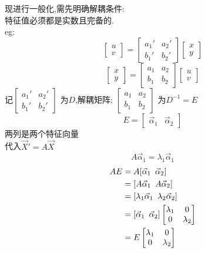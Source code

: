 现进行一般化,需先明确解耦条件:\\
特征值必须都是实数且完备的.\\
eg:
\[
\begin{bmatrix}
    u \\
    v
\end{bmatrix} =
\begin{bmatrix}
    a_1' & a_2' \\
    b_1' & b_2'
\end{bmatrix}
\begin{bmatrix}
    x \\
    y
\end{bmatrix}
\]
\[
\begin{bmatrix}
    x \\
    y
\end{bmatrix}=
\begin{bmatrix}
    a_1 & a_2 \\
    b_1 & b_2
\end{bmatrix}
\begin{bmatrix}
    u \\
    v
\end{bmatrix}
\]
记$
\begin{bmatrix}
    a_1' & a_2' \\
    b_1' & b_2'
\end{bmatrix}$ 为$D$,解耦矩阵; 
$\begin{bmatrix}
    a_1 & a_2 \\
    b_1 & b_2
\end{bmatrix}$ 为$D^{-1}=E$\\
\[ E =
\begin{bmatrix}
    \vec{\alpha}_1 & \vec{\alpha}_2
\end{bmatrix}
\]
两列是两个特征向量\\
代入$\vec{X}' = A \vec{X}$
\[ A \vec{\alpha}_1 = \lambda_1 \vec{\alpha}_1 \]
\begin{align*}
    A E &= A [\vec{\alpha}_1 \hspace*{0.5em} \vec{\alpha}_2] \\
    &= [A \vec{\alpha}_1 \hspace*{0.5em} A \vec{\alpha}_2] \\
    &= [\lambda_1 \vec{\alpha}_1 \hspace*{0.5em} \lambda_2\vec{\alpha}_2] \\
    &= [\vec{\alpha}_1 \hspace*{0.5em} \vec{\alpha}_2] 
    \begin{bmatrix}
        \lambda_1 & 0 \\
        0 & \lambda_2
    \end{bmatrix} \\
    &= E
    \begin{bmatrix}
        \lambda_1 & 0 \\
        0 & \lambda_2
    \end{bmatrix}
\end{align*}
